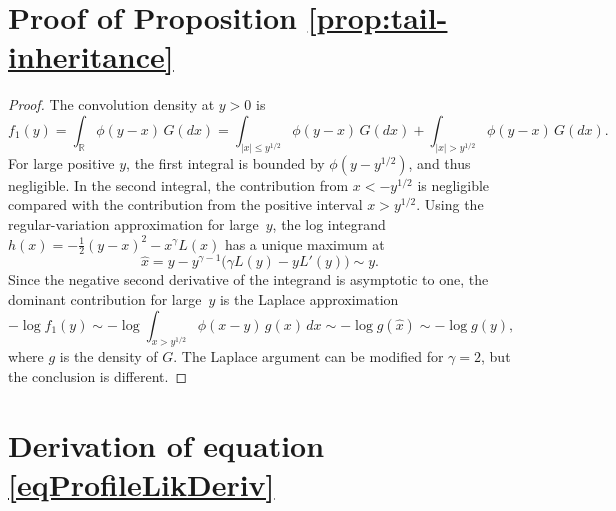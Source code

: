\documentclass[11pt]{article}
\theoremstyle{definition}
\def\Real{{\mathbb R}}
\def\vhalf{\textstyle{\frac 1 2}}
\begin{document}
\begin{appendix}
	\section{Proof of Proposition \ref{prop:tail-inheritance}}\label{app:tail-prop}

    \begin{proof}
The convolution density at $y > 0$ is
\[
f_1(y) = \int_\Real  \phi(y - x) \, G(dx) = \int_{|x|\le y^{1/2}} \phi(y - x) \, G(dx) 
	+ \int_{|x| > y^{1/2}}\phi(y - x) \, G(dx).
\]
For large positive $y$, the first integral is bounded by $\phi(y - y^{1/2})$, and thus negligible.
In the second integral, the contribution from $x < -y^{1/2}$ is negligible compared with
the contribution from the positive interval $x > y^{1/2}$.
Using the regular-variation approximation for large~$y$, the log integrand 
$h(x) = -\vhalf (y - x)^2 - x^\gamma L(x)$ has a unique maximum at
\[
\hat x = y - y^{\gamma-1} \bigl(\gamma L(y) - y L'(y) \bigr) \sim y.
\]
Since the negative second derivative of the integrand is asymptotic to one, 
the dominant contribution for large~$y$ is the Laplace approximation
\[
-\log f_1(y) \sim-\log \int _{x > y^{1/2}} \phi(x - y)\, g(x) \, dx \sim -\log g(\hat x) \sim -\log g(y),
\]
where $g$ is the density of $G$. The Laplace argument can be modified for $\gamma = 2$, but the conclusion is different.
\end{proof}
	


	\section{Derivation of equation \eqref{eqProfileLikDeriv}}\label{appProfileLik}
	

\end{appendix}
\end{document}
